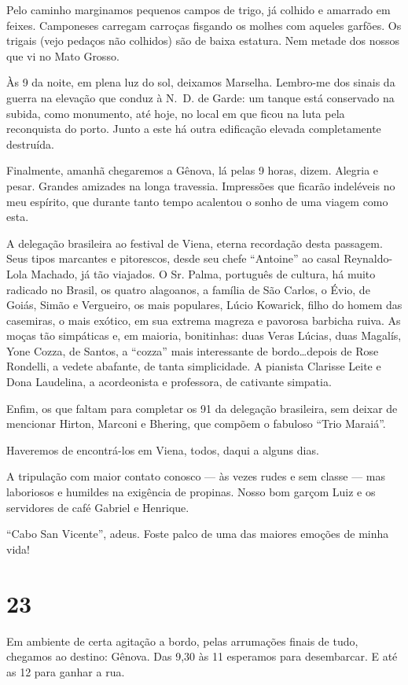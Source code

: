 Pelo caminho marginamos pequenos campos de trigo, já colhido e amarrado em feixes. Camponeses carregam carroças fisgando os molhes com aqueles garfões. Os trigais (vejo pedaços não colhidos) são de baixa estatura. Nem metade dos nossos que vi no Mato Grosso.

Às 9 da noite, em plena luz do sol, deixamos Marselha. Lembro-me dos sinais da guerra na elevação que conduz à N.~D. de Garde: um tanque está conservado na subida, como monumento, até hoje, no local em que ficou na luta pela reconquista do porto. Junto a este há outra edificação elevada completamente destruída.

Finalmente, amanhã chegaremos a Gênova, lá pelas 9 horas, dizem. Alegria e pesar. Grandes amizades na longa travessia. Impressões que ficarão indeléveis no meu espírito, que durante tanto tempo acalentou o sonho de uma viagem como esta.

A delegação brasileira ao festival de Viena, eterna recordação desta passagem. Seus tipos marcantes e pitorescos, desde seu chefe ``Antoine'' ao casal Reynaldo-Lola Machado, já tão viajados. O Sr. Palma, português de cultura, há muito radicado no Brasil, os quatro alagoanos, a família de São Carlos, o Évio, de Goiás, Simão e Vergueiro, os mais populares, Lúcio Kowarick, filho do homem das casemiras, o mais exótico, em sua extrema magreza e pavorosa barbicha ruiva. As moças tão simpáticas e, em maioria, bonitinhas: duas Veras Lúcias, duas Magalís, Yone Cozza, de Santos, a ``cozza'' mais interessante de bordo\ldots depois de Rose Rondelli, a vedete abafante, de tanta simplicidade. A pianista Clarisse Leite e Dona Laudelina, a acordeonista e professora, de cativante simpatia.

Enfim, os que faltam para completar os 91 da delegação brasileira, sem deixar de mencionar Hirton, Marconi e Bhering, que compõem o fabuloso ``Trio Maraiá''.

Haveremos de encontrá-los em Viena, todos, daqui a alguns dias.

A tripulação com maior contato conosco --- às vezes rudes e sem classe --- mas laboriosos e humildes na exigência de propinas. Nosso bom garçom Luiz e os servidores de café Gabriel e Henrique.

``Cabo San Vicente'', adeus. Foste palco de uma das maiores emoções de minha vida!

\section*{23 \adfflatleafright {}}
Em ambiente de certa agitação a bordo, pelas arrumações finais de tudo, chegamos ao destino: Gênova. Das 9,30 às 11 esperamos para desembarcar. E até as 12 para ganhar a rua.

